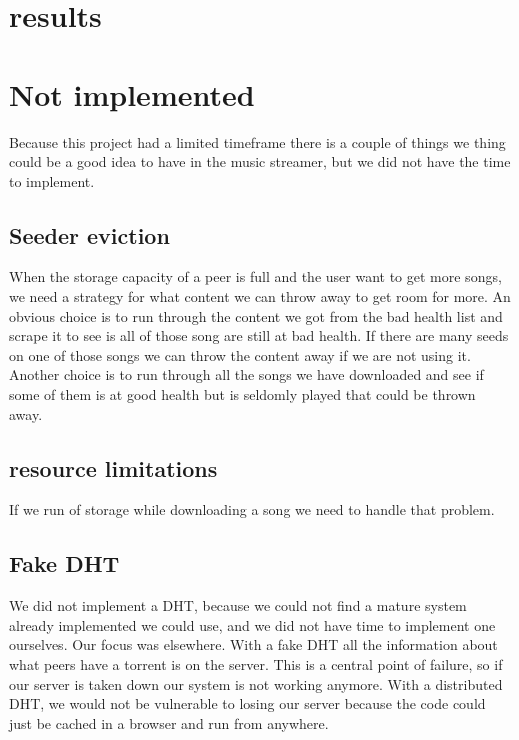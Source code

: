 
\section{results}

\section{Not implemented}
Because this project had a limited timeframe there is a couple of things we thing could be a good idea to have in the 
music streamer, but we did not have the time to implement.

\subsection{Seeder eviction}
When the storage capacity of a peer is full and the user want to get more songs, we need a strategy for what content we can throw away to get room for more.
An obvious choice is to run through the content we got from the bad health list and scrape it to see is all of those song are still at bad health. If there are many seeds on one of those songs we can throw the content away if we are not using it.
Another choice is to run through all the songs we have downloaded and see if some of them is at good health but is seldomly played that could be thrown away.

\subsection{resource limitations}
If we run of storage while downloading a song we need to handle that problem.
\subsection{Fake \acs{DHT}}
We did not implement a DHT, because we could not find a mature system already implemented we could use, and we did not have time to implement one ourselves.
Our focus was elsewhere.
With a fake \acs{DHT} all the information about what peers have a torrent is on the server. This is a central point of failure, so if our server is taken down our system is not working anymore.
With a distributed \acs{DHT}, we would not be vulnerable to losing our server because the code could just be cached in a browser and run from anywhere.
